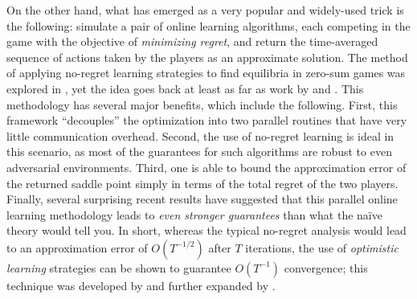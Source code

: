 \documentclass[pmlr]{jmlr} %
\begin{document}
On the other hand, what has emerged as a very popular and widely-used trick is the following: simulate a pair of online learning algorithms, each competing in the game with the objective of \emph{minimizing regret}, and return the time-averaged sequence of actions taken by the players as an approximate solution. The method of applying no-regret learning strategies to find equilibria in zero-sum games was explored in \citet{freund1999adaptive}, yet the idea goes back at least as far as work by \citet{blackwell1956analog} and \citet{hannan1957approximation}. This methodology has several major benefits, which include the following. First, this framework ``decouples'' the optimization into two parallel routines that have very little communication overhead. Second, the use of no-regret learning is ideal in this scenario, as most of the guarantees for such algorithms are robust to even adversarial environments. Third, one is able to bound the approximation error of the returned saddle point simply in terms of the total regret of the two players. Finally, several surprising recent results have suggested that this parallel online learning methodology leads to \emph{even stronger guarantees} than what the na\"{i}ve theory would tell you. In short, whereas the typical no-regret analysis would lead to an approximation error of $O(T^{-1/2})$ after $T$ iterations, the use of \emph{optimistic learning} strategies \citep{CJ12} can be shown to guarantee $O(T^{-1})$ convergence; this technique was developed by \citet{RK13} and further expanded by \citet{SALS15}.
\end{document}
